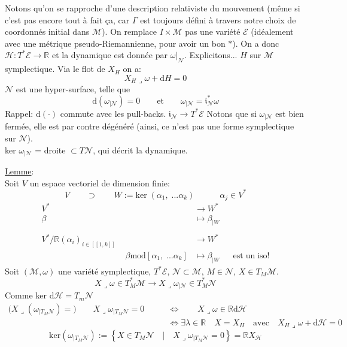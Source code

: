 \documentclass[a4paper,11pt]{article}
\renewcommand{\d}{{\mathrm{d}}}
\begin{document}
Notons qu'on se rapproche d'une description relativiste du mouvement (même si c'est pas encore tout à fait ça, car $\Gamma$ est toujours défini à travers notre choix de coordonnés initial dans $\mathcal{M}$).
On remplace $I\times\mathcal{M}$ pas une variété $\mathcal{E}$ (idéalement avec une métrique pseudo-Riemannienne, pour avoir un bon $*$). On a donc $\mathcal{H}:T^*\mathcal{E}\to\mathbb{R}$ et la dynamique est donnée par $\omega|_\mathcal{N}$. Explicitons...
$H$ sur $\mathcal{M}$ symplectique. Via le flot de $X_H$ on a:
$$X_H\lrcorner\omega+\d H = 0$$
$\mathcal{N}$ est une hyper-surface, telle que
$$\d\left(\omega_{|\mathcal{N}}\right)=0 \quad \quad \mathrm{et} \quad \quad
\omega_{|\mathcal{N}}=\mathfrak{i}_\mathcal{N}^*\omega$$
Rappel: $\d(\cdot)$ commute avec les pull-backs. \quad \quad \quad $\mathfrak{i}_\mathcal{N}\to T^*\mathcal{E}$
Notons que si $\omega_{|\mathcal{N}}$ est bien fermée, elle est par contre dégénéré (ainsi, ce n'est pas une forme symplectique sur $\mathcal{N}$).\\
ker $\omega_{|\mathcal{N}}$ = droite $\subset T\mathcal{N}$, qui décrit la dynamique.

\noindent \underline{Lemme}:\\
Soit $V$ un espace vectoriel de dimension finie:
$$V \quad \quad \supset \quad \quad W:= \mathrm{ker}\; (\alpha_1, \; ...\alpha_k) \quad \quad \quad \alpha_j \in V^*$$
\begin{align*}
V^* & \to W^* &&\\
\beta & \mapsto \beta_{|W} &&\\
\,& &&\\
V^*/\mathbb{R}(\alpha_i)_{i\in[\![1,k]\!]} & \to W^* &&\\
\quad\quad\quad\quad\quad\quad\quad\quad\quad\quad
\beta \mathrm{mod} [\alpha_1, \; ... \alpha_k] & \mapsto \beta_{|W}&&
\mathrm{est} \; \mathrm{un}\;\mathrm{iso}!
\end{align*}
Soit $(\mathcal{M},\omega)$ une variété symplectique, $T^*\mathcal{E}$, $\mathcal{N}\subset\mathcal{M}$, $M\in\mathcal{N}$, $X\in T_M\mathcal{M}$.
$$X\lrcorner \omega \in T_M^*\mathcal{M} \to X\lrcorner \omega_{|\mathcal{N}} \in T_M^*\mathcal{N}$$
Comme ker $\d\mathcal{H}=T_m\mathcal{N}$
\begin{align*}
\Big(X\lrcorner(\omega_{|T_M\mathcal{N}})=\Big) \quad \quad X\lrcorner \omega_{|T_M\mathcal{N}} = 0 \quad \quad &\iff \quad \quad X\lrcorner \omega \in \mathbb{R}\d \mathcal{H}\\
&\iff \exists \lambda \in \mathbb{R} \quad X = X_H \quad \mathrm{avec} \quad X_H\lrcorner\omega+\d \mathcal{H}=0
\end{align*}
$$\mathrm{ker}\left(\omega_{|T_M\mathcal{N}}\right)
:= \left\{X\in T_M\mathcal{N} \quad |\quad X\lrcorner\omega_{|T_M\mathcal{N}} = 0 \right\} = \mathbb{R}X_\mathcal{H}$$
\end{document}
